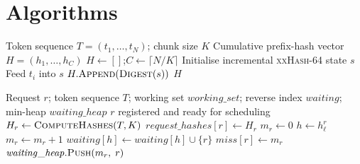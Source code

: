 \appendix

\section{Algorithms}
\begin{algorithm}[H]
\caption{$\textsc{ComputeHashes}(T, K)$}
\label{alg:compute_hashes}
\begin{algorithmic}[1]
\Require Token sequence $T = (t_1, \dots, t_N)$; chunk size $K$
\Ensure Cumulative prefix-hash vector $H = (h_1, \dots, h_C)$
\State $H \gets []$;\quad $C \gets \lceil N / K \rceil$
\State Initialise incremental \textsc{xxHash-64} state $s$
  \State Feed $t_i$ into $s$
    \State $H.\textsc{Append}(\textsc{Digest}(s))$
  \EndIf
\EndFor
\State \Return $H$
\end{algorithmic}
\end{algorithm}


\begin{algorithm}[H]
\caption{$\textsc{Insert}(r, T)$}
\label{alg:insert}
\begin{algorithmic}[1]
\Require Request $r$; token sequence $T$; working set $\mathit{working\_set}$; reverse index $\mathit{waiting}$; min-heap $\mathit{waiting\_heap}$
\Ensure $r$ registered and ready for scheduling
\State $H_r \gets \textsc{ComputeHashes}(T, K)$
\State $\mathit{request\_hashes}[r] \gets H_r$
\State $m_r \gets 0$
  \State $h \gets h_\ell^r$
    \State $m_r \gets m_r + 1$
  \EndIf
  \State $\mathit{waiting}[h] \gets \mathit{waiting}[h] \cup \{r\}$
\EndFor
\State $\mathit{miss}[r] \gets m_r$
\State $\mathit{waiting\_heap}.\textsc{Push}(m_r,\; r)$
\end{algorithmic}
\end{algorithm}

